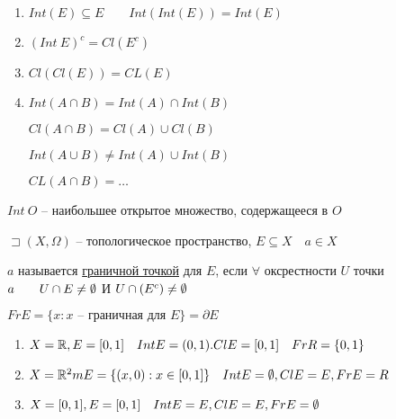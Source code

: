 \begin{problem}
    \begin{enumerate}
        \item $Int(E)\subseteq E\qquad Int(Int(E)) = Int(E)$
        \item $(Int~E)^c = Cl(E^c)$
        \item  $Cl(Cl(E)) = CL(E)$
        \item  $Int(A\cap B) = Int(A)\cap Int(B)$
        
            $Cl(A\cap B) = Cl(A)\cup Cl(B)$ 
            
            $Int(A\cup B)\neq Int(A) \cup Int(B)$ 

            $CL(A\cap B) = \ldots$
    \end{enumerate}
\end{problem}

\begin{note}
    $Int~O$ -- наибольшее открытое множество, содержащееся в  $O$
\end{note}

\begin{definition}
    $\sqsupset (X, \Omega)$ -- топологическое пространство, $E\subseteq X\quad a\in X$

    $a$ называется \underline{граничной точкой} для  $E$, если  $\forall $ оксрестности $U$ точки  $a\qquad U\cap E\neq \emptyset $ И $U\cap (E^c)\neq \emptyset $

    $Fr E = \{x: x\text{ -- граничная для } E\} = \partial E$
\end{definition}

\begin{example}
    \begin{enumerate}
        \item $X = \mathbb{R}, E = [0,1]\quad Int E = (0,1). Cl E = [0,1]\quad FrR = \{0, 1\}$
        \item $X = \mathbb{R}^2m E = \{(x,0): x\in [0,1]\}\quad Int E = \emptyset , ClE = E, FrE = R$
        \item $ X = [0,1], E = [0,1]\quad Int E = E, ClE = E, Fr E = \emptyset $
    \end{enumerate}
\end{example}


